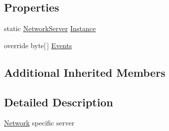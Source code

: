\subsection*{Properties}
\begin{DoxyCompactItemize}
\item 
static \hyperlink{classgearit_1_1src_1_1_network_1_1_network_server}{Network\+Server} \hyperlink{classgearit_1_1src_1_1_network_1_1_network_server_a0cee12fff2e52615aac32f2f93165ea8}{Instance}
\item 
override byte\mbox{[}$\,$\mbox{]} \hyperlink{classgearit_1_1src_1_1_network_1_1_network_server_a6a5ae7fa9d299945a9f147ef69ab6c40}{Events}
\end{DoxyCompactItemize}
\subsection*{Additional Inherited Members}


\subsection{Detailed Description}
\hyperlink{namespacegearit_1_1src_1_1_network}{Network} specific server 



